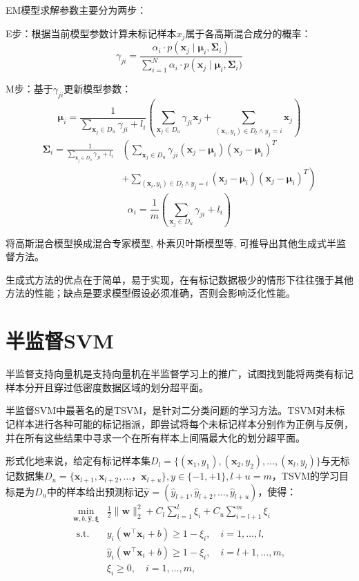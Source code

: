 {EM模型求解参数主要分为两步：

E步：根据当前模型参数计算未标记样本$x_j$属于各高斯混合成分的概率：\[
\gamma_{j i}=\frac{\alpha_{i} \cdot p\left(\boldsymbol{x}_{j} \mid \boldsymbol{\mu}_{i}, \boldsymbol{\Sigma}_{i}\right)}{\sum_{i=1}^{N} \alpha_{i} \cdot p\left(\boldsymbol{x}_{j} \mid \boldsymbol{\mu}_{i}, \boldsymbol{\Sigma}_{i})\right.}
\]

M步：基于$\gamma_{ji}$更新模型参数：\[
\boldsymbol{\mu}_{i}=\frac{1}{\sum_{\boldsymbol{x}_{j} \in D_{u}} \gamma_{j i}+l_{i}}\left(\sum_{\boldsymbol{x}_{j} \in D_{u}} \gamma_{j i} \boldsymbol{x}_{j}+\sum_{\left(\boldsymbol{x}_{i}, y_{i}\right) \in D_{l} \wedge y_{j}=i} \boldsymbol{x}_{j}\right)
\]\[
\begin{aligned} \boldsymbol{\Sigma}_{i}=\frac{1}{\sum_{\boldsymbol{x}_{j} \in D_{u}} \gamma_{j i}+l_{i}} & \left(\sum_{\boldsymbol{x}_{j} \in D_{u}} \gamma_{j i}\left(\boldsymbol{x}_{j}-\boldsymbol{\mu}_{i}\right)\left(\boldsymbol{x}_{j}-\boldsymbol{\mu}_{i}\right)^{T}\right. \\ & \left.+\sum_{\left(\boldsymbol{x}_{i}, y_{i}\right) \in D_{l} \wedge y_{j}=i}\left(\boldsymbol{x}_{j}-\boldsymbol{\mu}_{i}\right)\left(\boldsymbol{x}_{j}-\boldsymbol{\mu}_{i}\right)^{T}\right)\end{aligned}
\]\[
\alpha_{i}=\frac{1}{m}\left(\sum_{\boldsymbol{x}_{j} \in D_{u}} \gamma_{j i}+l_{i}\right)
\]
}
将高斯混合模型换成混合专家模型, 朴素贝叶斯模型等, 可推导出其他生成式半监督方法。

生成式方法的优点在于简单，易于实现，在有标记数据极少的情形下往往强于其他方法的性能；缺点是要求模型假设必须准确，否则会影响泛化性能。
\section{半监督SVM}\label{sec:12.3}
半监督支持向量机是支持向量机在半监督学习上的推广，试图找到能将两类有标记样本分开且穿过低密度数据区域的划分超平面。

半监督SVM中最著名的是TSVM，是针对二分类问题的学习方法。TSVM对未标记样本进行各种可能的标记指派，即尝试将每个未标记样本分别作为正例与反例，并在所有这些结果中寻求一个在所有样本上间隔最大化的划分超平面。

形式化地来说，给定有标记样本集$D_l = \{(\boldsymbol x_1, y_1),(\boldsymbol x_2, y_2),\ldots,(\boldsymbol x_l, y_l)\}$与无标记数据集$D_u = \{\boldsymbol x_{l+1}, \boldsymbol x_{l+2}, \ldots，\boldsymbol x_{l+u}\}, y\in\{-1, +1\}, l+u=m$，TSVM的学习目标是为$D_u$中的样本给出预测标记$\hat{\boldsymbol y} = (\hat{y}_{l+1},\hat{y}_{l+2},\ldots,\hat{y}_{l+u})$，使得：
\[
\begin{aligned} \min _{\boldsymbol{w}, b, \hat{\boldsymbol{y}}, \boldsymbol{\xi}} & \frac{1}{2}\|\boldsymbol{w}\|_{2}^{2}+C_{l} \sum_{i=1}^{l} \xi_{i}+C_{u} \sum_{i=l+1}^{m} \xi_{i} \\ \text { s.t. } & y_{i}\left(\boldsymbol{w}^{\top} \boldsymbol{x}_{i}+b\right) \geq 1-\xi_{i}, \quad i=1, \ldots, l, \\ & \hat{y}_{i}\left(\boldsymbol{w}^{\top} \boldsymbol{x}_{i}+b\right) \geq 1-\xi_{i}, \quad i=l+1, \ldots, m, \\ & \xi_{i} \geq 0, \quad i=1, \ldots, m,\end{aligned}
\]

